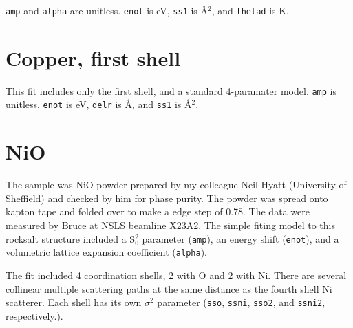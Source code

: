 \documentclass{article}
\let\stdsection\section
\renewcommand\section{\newpage\stdsection}
\begin{document}
\texttt{amp} and \texttt{alpha} are unitless.  \texttt{enot} is eV,
\texttt{ss1} is \AA$^2$, and \texttt{thetad} is K.


\renewcommand{\feffmaterial}{Copper} %
\renewcommand{\feffrone}{3}          %
\renewcommand{\feffrtwo}{4}          %
\renewcommand{\feffrthree}{5}        %
\renewcommand{\feffrfour}{5.5}       %
\renewcommand{\feffrfive}{6}         %
\renewcommand{\fefffirst}{}     %

\small

\fitplots



\section{Copper, first shell}

\normalsize
This fit includes only the first shell, and a standard 4-paramater
model.  \texttt{amp} is unitless.  \texttt{enot} is eV, \texttt{delr}
is \AA, and \texttt{ss1} is \AA$^2$.

\renewcommand{\fefffirst}{_1st}

\small

\fitplots





\section{NiO}

\normalsize

The sample was NiO powder prepared by my colleague Neil Hyatt
(University of Sheffield) and checked by him for phase purity.  The
powder was spread onto kapton tape and folded over to make a edge step
of 0.78.  The data were measured by Bruce at NSLS beamline X23A2.  The
simple fiting model to this rocksalt structure included a S$_0^2$
parameter (\texttt{amp}), an energy shift (\texttt{enot}), and a
volumetric lattice expansion coefficient (\texttt{alpha}).

The fit included 4 coordination shells, 2 with O and 2 with Ni.  There
are several collinear multiple scattering paths at the same distance
as the fourth shell Ni scatterer.  Each shell has its own $\sigma^2$
parameter (\texttt{sso}, \texttt{ssni}, \texttt{sso2}, and
\texttt{ssni2}, respectively.).
\end{document}
